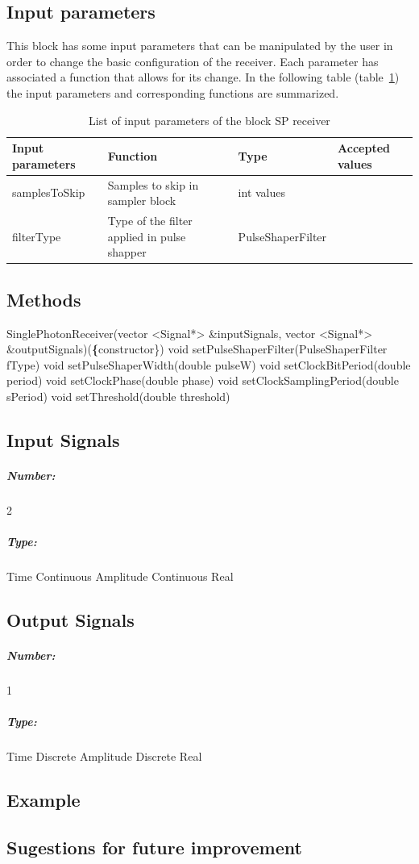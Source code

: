 \subsection*{Input parameters}

This block has some input parameters that can be manipulated by the user in order to change the basic configuration of the receiver. Each parameter has associated a function that allows for its change. In the following table (table~\ref{table}) the input parameters and corresponding functions are summarized.

\begin{table}[h]
	\begin{center}
		\begin{tabular}{| m{} | m{} |  m{} | m{4cm} | }
			\hline
			\textbf{Input parameters} & \textbf{Function} & Type & \textbf{Accepted values} \\ \hline
			samplesToSkip            & Samples to skip in sampler block & int values\\
            filterType                  & Type of the filter applied in pulse shapper & PulseShaperFilter \\
            
			\hline
		\end{tabular}
		\caption{List of input parameters of the block SP receiver} \label{table}
	\end{center}
\end{table}

\pagebreak

\subsection*{Methods}

SinglePhotonReceiver(vector <Signal*> \&inputSignals, vector <Signal*> \&outputSignals)(\textbf\{constructor\})
\bigbreak
void setPulseShaperFilter(PulseShaperFilter fType)
\bigbreak
void setPulseShaperWidth(double pulseW)
\bigbreak
void setClockBitPeriod(double period)
\bigbreak
void setClockPhase(double phase) 
\bigbreak
void setClockSamplingPeriod(double sPeriod)
\bigbreak
void setThreshold(double threshold) 

\pagebreak

\subsection*{Input Signals}

\subparagraph*{Number:} 2

\subparagraph*{Type:} Time Continuous Amplitude Continuous Real

\subsection*{Output Signals}

\subparagraph*{Number:} 1

\subparagraph*{Type:} Time Discrete Amplitude Discrete Real

\subsection*{Example}

\subsection*{Sugestions for future improvement}
